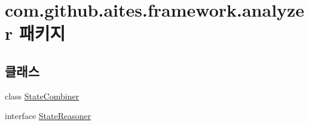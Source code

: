 \hypertarget{namespacecom_1_1github_1_1aites_1_1framework_1_1analyzer}{}\section{com.\+github.\+aites.\+framework.\+analyzer 패키지}
\label{namespacecom_1_1github_1_1aites_1_1framework_1_1analyzer}
\subsection*{클래스}
\begin{DoxyCompactItemize}
\item 
class \mbox{\hyperlink{classcom_1_1github_1_1aites_1_1framework_1_1analyzer_1_1_state_combiner}{State\+Combiner}}
\item 
interface \mbox{\hyperlink{interfacecom_1_1github_1_1aites_1_1framework_1_1analyzer_1_1_state_reasoner}{State\+Reasoner}}
\end{DoxyCompactItemize}
